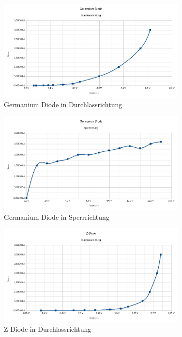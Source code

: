 \begin{enumerate}[label=\alph*)]
	      \pagebreak

	      \begin{figure}[h!]
		      \begin{center}
			      \includegraphics[width=0.85\textwidth]{img/4.1.a.3}
			      \caption{Germanium Diode in Durchlassrichtung}
		      \end{center}
	      \end{figure}

	      \begin{figure}[h!]
		      \begin{center}
			      \includegraphics[width=0.85\textwidth]{img/4.1.a.4}
			      \caption{Germanium Diode in Sperrrichtung}
		      \end{center}
	      \end{figure}

	      \pagebreak

	      \begin{figure}[h!]
		      \begin{center}
			      \includegraphics[width=0.85\textwidth]{img/4.1.a.5}
			      \caption{Z-Diode in Durchlassrichtung}
		      \end{center}
	      \end{figure}


\end{enumerate}
